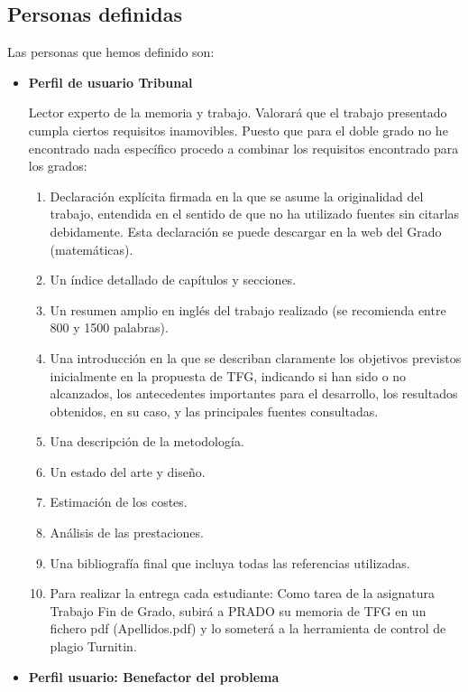 \subsection{Personas definidas}  

Las personas que hemos definido son:  

\begin{itemize}
    \item \textbf{Perfil de usuario Tribunal}

Lector experto  de la memoria y trabajo. Valorará que el trabajo presentado  cumpla ciertos requisitos inamovibles.
Puesto que para el doble grado no he encontrado nada específico procedo a combinar los requisitos encontrado para los grados:

\begin{enumerate}
    \item Declaración explícita firmada en la que se asume la originalidad del trabajo, entendida en el sentido de que no ha utilizado fuentes sin citarlas debidamente. Esta declaración se puede descargar en la web del Grado (matemáticas).
    \item Un índice detallado de capítulos y secciones.
    \item Un resumen amplio en inglés del trabajo realizado (se recomienda entre 800 y 1500 palabras).
    \item Una introducción en la que se describan claramente los objetivos previstos inicialmente en la propuesta de TFG, indicando si han sido o no alcanzados, los antecedentes importantes para el desarrollo, los resultados obtenidos, en su caso, y las principales fuentes consultadas.
    \item Una descripción de la metodología.
    \item Un estado del arte y diseño.
    \item Estimación de los costes.
    \item Análisis de las prestaciones.
    \item Una bibliografía final que incluya todas las referencias utilizadas.
    \item Para realizar la entrega cada estudiante: Como tarea de la asignatura Trabajo Fin de Grado, subirá a PRADO su memoria de TFG en un fichero pdf (Apellidos.pdf) y lo someterá a la herramienta de control de plagio Turnitin.

\end{enumerate}


\item \textbf{Perfil usuario: Benefactor del problema}


\end{itemize}
